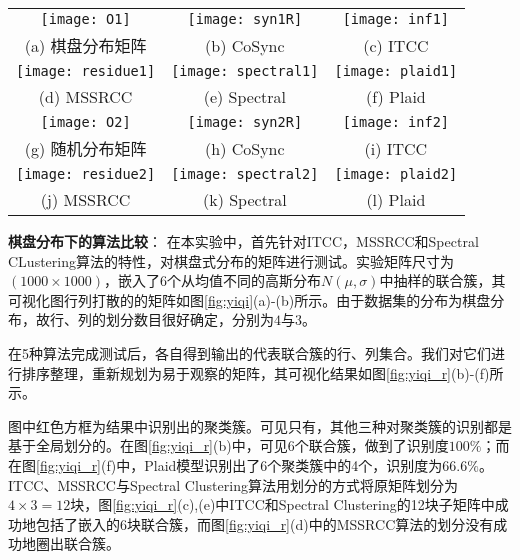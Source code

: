 \tabcolsep=1pt
\begin{figure*}[!p]
\centering
\begin{tabular}{ccc}
\texttt{[image: O1]}&
\texttt{[image: syn1R]}&
\texttt{[image: inf1]}\\
(a) 棋盘分布矩阵  & (b) CoSync &  (c) ITCC\\
\texttt{[image: residue1]}&
\texttt{[image: spectral1]}&
\texttt{[image: plaid1]}\\
(d) MSSRCC &  (e)  Spectral &  (f) Plaid\\
\texttt{[image: O2]}&
\texttt{[image: syn2R]}&
\texttt{[image: inf2]}\\
(g) 随机分布矩阵  & (h) CoSync &  (i) ITCC\\
\texttt{[image: residue2]}&
\texttt{[image: spectral2]}&
\texttt{[image: plaid2]}\\
(j) MSSRCC &  (k)  Spectral &  (l) Plaid
\end{tabular}
\caption{五种算法在棋盘分布矩阵和随机分布矩阵上运行结果图。(a)为棋盘分布原矩阵。(b)-(f)为五种算法在棋盘分布矩阵上的聚类结果可视化。(g)为随机分布原矩阵。(h)-(l)是五种算法在随机分布矩阵上的聚类结果可视化。
图中红色方框为算法找出的聚类簇。}
\label{fig:yiqi_r}
\end{figure*}

\vspace{3mm}
\textbf{棋盘分布下的算法比较}：
在本实验中，首先针对ITCC，MSSRCC和Spectral CLustering算法的特性，对棋盘式分布的矩阵进行测试。实验矩阵尺寸为$(1000\times1000)$，嵌入了6个从均值不同的高斯分布$N(\mu,\sigma)$中抽样的联合簇，其可视化图行列打散的的矩阵如图\ref{fig:yiqi}(a)-(b)所示。由于数据集的分布为棋盘分布，故行、列的划分数目很好确定，分别为$4$与$3$。

在5种算法完成测试后，各自得到输出的代表联合簇的行、列集合。我们对它们进行排序整理，重新规划为易于观察的矩阵，其可视化结果如图\ref{fig:yiqi_r}(b)-(f)所示。

图中红色方框为结果中识别出的聚类簇。可见只有，其他三种对聚类簇的识别都是基于全局划分的。在图\ref{fig:yiqi_r}(b)中，可见6个联合簇，做到了识别度$100\%$；而在图\ref{fig:yiqi_r}(f)中，Plaid模型识别出了6个聚类簇中的4个，识别度为$66.6\%$。ITCC、MSSRCC与Spectral Clustering算法用划分的方式将原矩阵划分为$4\times3=12$块，图\ref{fig:yiqi_r}(c),(e)中ITCC和Spectral Clustering的12块子矩阵中成功地包括了嵌入的6块联合簇，而图\ref{fig:yiqi_r}(d)中的MSSRCC算法的划分没有成功地圈出联合簇。

